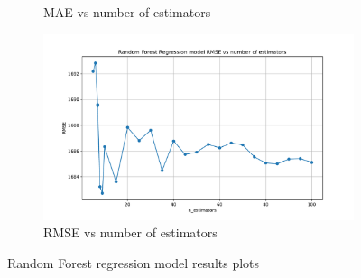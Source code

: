 \begin{figure}[!htbp]
\begin{subfigure}[b]{0.45\textwidth}
        \caption{MAE vs number of estimators}
        \label{Fig: RF MSE vs nn}
    \end{subfigure}
    \hfill
    \begin{subfigure}[b]{0.45\textwidth}
        \includegraphics[width=\textwidth]{../regression_model/plots/RandomForest/Random Forest Regression model RMSE vs n_estimators.pdf}
        \caption{RMSE vs number of estimators}
        \label{Fig: RF RMSE vs nn}
    \end{subfigure}
    \caption[Random Forest metric results]{Random Forest regression model results plots}
\end{figure}
